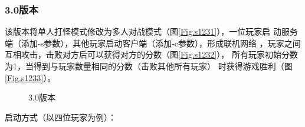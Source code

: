 \documentclass{SCIS2022cn}
\begin{document}
\subsubsection{3.0版本}

该版本将单人打怪模式修改为多人对战模式（图\ref{Fig.s1231}），一位玩家启
动服务端（添加-s参数），其他玩家启动客户端（添加-c参数），形成联机网络
，玩家之间互相攻击，击败对方后可以获得对方的分数（图\ref{Fig.s1232}），
所有玩家初始分数为1，当得到与玩家数量相同的分数（击败其他所有玩家）
时获得游戏胜利（图\ref{Fig.s1233}）。

\begin{figure}[H]
    \centering
    \caption{3.0版本}
    \label{Fig.f123}
\end{figure}

启动方式（以四位玩家为例）：
\end{document}
